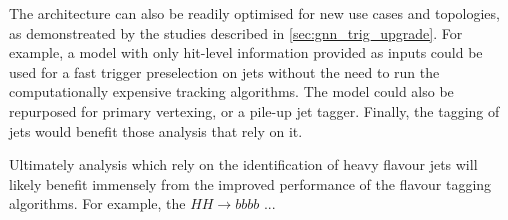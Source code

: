 The \GNN architecture can also be readily optimised for new use cases and topologies, as demonstreated by the studies described in \cref{sec:gnn_trig_upgrade}.
For example, a model with only hit-level information provided as inputs could be used for a fast trigger preselection on jets without the need to run the computationally expensive tracking algorithms.
The model could also be repurposed for primary vertexing, or a pile-up jet tagger.
Finally, the tagging of \largeR jets would benefit those analysis that rely on it.

Ultimately analysis which rely on the identification of heavy flavour jets will likely benefit immensely from the improved performance of the flavour tagging algorithms.
For example, the $HH \rightarrow bbbb$ ... 
